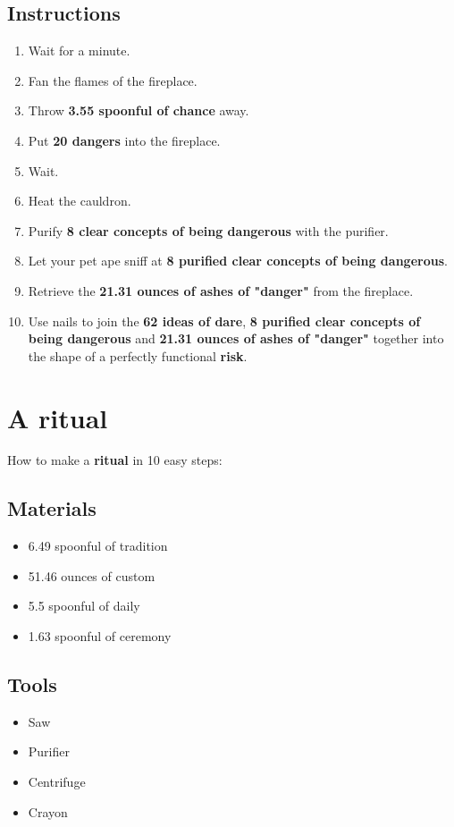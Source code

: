 \documentclass{article}
\begin{document}
\subsection{Instructions}\begin{enumerate}
\item 
Wait for a minute.
\item 
Fan the flames of the fireplace.
\item 
Throw \textbf{3.55 spoonful of chance} away.
\item 
Put \textbf{20 dangers} into the fireplace.
\item 
Wait.
\item 
Heat the cauldron.
\item 
Purify \textbf{8 clear concepts of being dangerous} with the purifier.
\item 
Let your pet ape sniff at \textbf{8 purified clear concepts of being dangerous}.
\item 
Retrieve the \textbf{21.31 ounces of ashes of "danger"} from the fireplace.
\item 
Use nails to join the \textbf{62 ideas of dare}, \textbf{8 purified clear concepts of being dangerous} and \textbf{21.31 ounces of ashes of "danger"} together into the shape of a perfectly functional \textbf{risk}.
\end{enumerate}
\newpage
\section{A ritual}How to make a \textbf{ritual} in 10 easy steps:

\subsection{Materials}\begin{itemize}
\item 
6.49 spoonful of tradition
\item 
51.46 ounces of custom
\item 
5.5 spoonful of daily
\item 
1.63 spoonful of ceremony
\end{itemize}
\subsection{Tools}\begin{itemize}
\item 
Saw
\item 
Purifier
\item 
Centrifuge
\item 
Crayon
\end{itemize}
\end{document}
